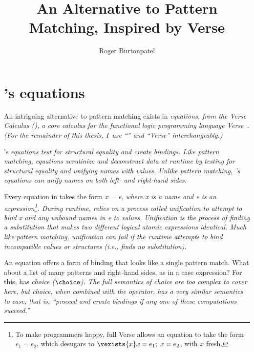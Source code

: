 \documentclass[manuscript,screen,review, 12pt, nonacm]{acmart}
\title{An Alternative to Pattern Matching, Inspired by Verse}
\author{Roger Burtonpatel}
\affiliation{%
  \institution{Tufts University}
  \streetaddress{419 Boston Ave}
  \city{Medford}
  \state{Massachusetts}
  \country{USA}
  \postcode{02155}
}
\begin{document}
    
    \section{\VC's equations}
    \label{verseoverobservers}

    An intriguing alternative to pattern matching exists in \it{equations}, from
    the Verse Calculus (\VC), a core calculus for the functional logic
    programming language \it{Verse}~\citep{antoy2010functional,
    hanus2013functional, verse}. (For the remainder of this thesis, I~use “\VC”
    and “Verse” interchangeably.)



    \VC's \it{equations} test for structural equality and create bindings. Like
    pattern matching, equations scrutinize and deconstruct data at runtime by
    testing for structural equality and unifying names with values. Unlike
    pattern matching, \VC's equations can unify names on both left- \it{and}
    right-hand sides. 

    Every equation in \VC takes the form \it{x = e}, where \it{x} is a name and
    \it{e} is an expression\footnote{To make programmers happy, full Verse
    allows an equation to take the form $e_{1} = e_{2}$, which desugars to
    $\vexists{x} x = e_{1};\; x = e_{2}$, with $x$ fresh.}. During runtime, \VC
    relies on a process called \it{unification} to attempt to bind \it{x} and
    any unbound names in \it{e} to values. Unification is the process of finding
    a substitution that makes two different logical atomic expressions
    identical. Much like pattern matching, unification can fail if the runtime
    attempts to bind incompatible values or structures (i.e., finds no
    substitution). 

    An equation offers a form of binding that looks like a single pattern match.
    What about a list of many patterns and right-hand sides, as in a case
    expression? For this, \VC has \it{choice} ($\choice$). The full semantics of
    choice are too complex to cover here, but choice, when combined with the
    \one operator, has a very similar semantics to case; that is, “proceed
    and create bindings if any one of these computations succeed.” 
\end{document}

